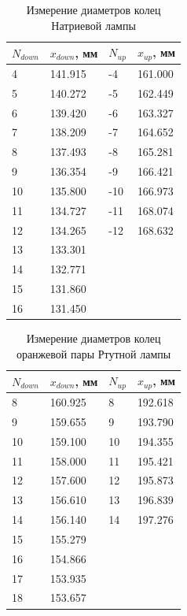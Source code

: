 \documentclass[a4paper,12pt]{article}
\begin{document}
\FloatBarrier
\begin{table}[!ht]
    \centering
    \caption{Измерение диаметров колец Натриевой лампы}
    \begin{tabular}{|l|l|l|l|}
        \hline
        $N_{down}$ & $x_{down}$, мм & $N_{up}$ & $x_{up}$, мм   \\ \hline
        4       & 141.915 & -4    & 161.000 \\ \hline
        5       & 140.272 & -5    & 162.449 \\ \hline
        6       & 139.420 & -6    & 163.327 \\ \hline
        7       & 138.209 & -7    & 164.652 \\ \hline
        8       & 137.493 & -8    & 165.281 \\ \hline
        9       & 136.354 & -9    & 166.421 \\ \hline
        10      & 135.800 & -10   & 166.973 \\ \hline
        11      & 134.727 & -11   & 168.074 \\ \hline
        12      & 134.265 & -12   & 168.632 \\ \hline
        13      & 133.301 &       &         \\ \hline
        14      & 132.771 &       &         \\ \hline
        15      & 131.860 &       &         \\ \hline
        16      & 131.450 &       &         \\ \hline
    \end{tabular}
    \label{table:2}
\end{table}
\FloatBarrier

\FloatBarrier
\begin{table}[!ht]
    \centering
    \caption{Измерение диаметров колец оранжевой пары Ртутной лампы}
    \begin{tabular}{|l|l|l|l|}
        \hline
        $N_{down}$ & $x_{down}$, мм & $N_{up}$ & $x_{up}$, мм   \\ \hline
        8       & 160.925 & 8     & 192.618 \\ \hline
        9       & 159.655 & 9     & 193.790 \\ \hline
        10      & 159.100 & 10    & 194.355 \\ \hline
        11      & 158.000 & 11    & 195.421 \\ \hline
        12      & 157.600 & 12    & 195.873 \\ \hline
        13      & 156.610 & 13    & 196.839 \\ \hline
        14      & 156.140 & 14    & 197.276 \\ \hline
        15      & 155.279 &       &         \\ \hline
        16      & 154.866 &       &         \\ \hline
        17      & 153.935 &       &         \\ \hline
        18      & 153.657 &       &         \\ \hline
    \end{tabular}
    \label{table:3}
\end{table}
\FloatBarrier
\end{document}
